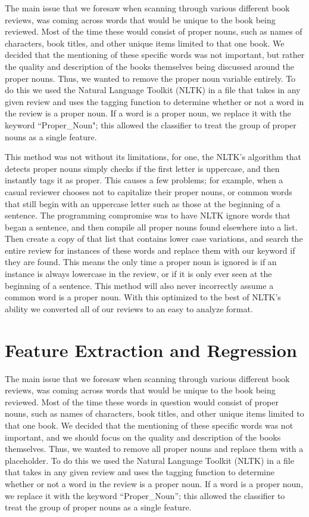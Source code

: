 \documentclass{article}
\begin{document}
\begin{multicols}{2}
The main issue that we foresaw when scanning through various different book reviews, was coming across words that would be unique to the book being reviewed. Most of the time these would consist of proper nouns, such as names of characters, book titles, and other unique items limited to that one book. We decided that the mentioning of these specific words was not important, but rather the quality and description of the books themselves being discussed around the proper nouns. Thus, we wanted to remove the proper noun variable entirely. To do this we used the Natural Language Toolkit (NLTK)\cite{nltk} in a file that takes in any given review and uses the tagging function to determine whether or not a word in the review is a proper noun. If a word is a proper noun, we replace it with the keyword “Proper\_Noun"; this allowed the classifier to treat the group of proper nouns as a single feature. 
 
This method was not without its limitations, for one, the NLTK’s algorithm that detects proper nouns simply checks if the first letter is uppercase, and then instantly tags it as proper. This causes a few problems; for example, when a casual reviewer chooses not to capitalize their proper nouns, or common words that still begin with an uppercase letter such as those at the beginning of a sentence. The programming compromise was to have NLTK ignore words that began a sentence, and then compile all proper nouns found elsewhere into a list. Then create a copy of that list that contains lower case variations, and search the entire review for instances of these words and replace them with our keyword if they are found. This means the only time a proper noun is ignored is if an instance is always lowercase in the review, or if it is only ever seen at the beginning of a sentence. This method will also never incorrectly assume a common word is a proper noun. With this optimized to the best of NLTK’s ability we converted all of our reviews to an easy to analyze format.

\section{Feature Extraction and Regression}

The main issue that we foresaw when scanning through various different book reviews, was coming across words that would be unique to the book being reviewed. Most of the time these words in question would consist of proper nouns, such as names of characters, book titles, and other unique items limited to that one book. We decided that the mentioning of these specific words was not important, and we should focus on the quality and description of the books themselves. Thus, we wanted to remove all proper nouns and replace them with a placeholder. To do this we used the Natural Language Toolkit (NLTK)\cite{nltk} in a file that takes in any given review and uses the tagging function to determine whether or not a word in the review is a proper noun. If a word is a proper noun, we replace it with the keyword “Proper\_Noun”; this allowed the classifier to treat the group of proper nouns as a single feature. 


\end{multicols}
\end{document}
